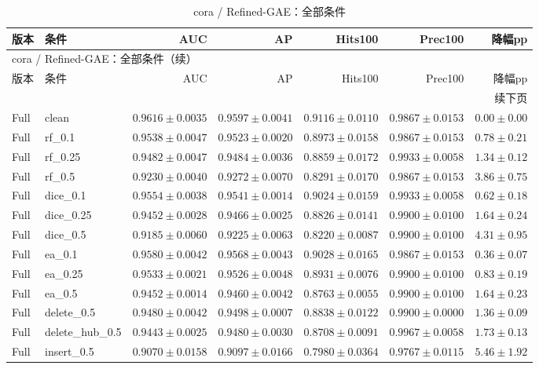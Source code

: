 \documentclass[UTF8,a4paper,11pt,fontset=fandol]{ctexart}
\begin{document}
{\footnotesize
\setlength{\tabcolsep}{3pt}
\begin{longtable}{llrrrrr}
\caption{cora / Refined-GAE：全部条件}\\
\toprule
版本 & 条件 & AUC & AP & Hits100 & Prec100 & 降幅pp \\
\midrule
\endfirsthead
\multicolumn{7}{l}{cora / Refined-GAE：全部条件（续）}\\
\toprule
版本 & 条件 & AUC & AP & Hits100 & Prec100 & 降幅pp \\
\midrule
\endhead
\midrule\multicolumn{7}{r}{续下页}\\
\endfoot
\bottomrule\endlastfoot
Full & clean & $0.9616\pm0.0035$ & $0.9597\pm0.0041$ & $0.9116\pm0.0110$ & $0.9867\pm0.0153$ & $0.00\pm0.00$ \\
Full & rf\_0.1 & $0.9538\pm0.0047$ & $0.9523\pm0.0020$ & $0.8973\pm0.0158$ & $0.9867\pm0.0153$ & $0.78\pm0.21$ \\
Full & rf\_0.25 & $0.9482\pm0.0047$ & $0.9484\pm0.0036$ & $0.8859\pm0.0172$ & $0.9933\pm0.0058$ & $1.34\pm0.12$ \\
Full & rf\_0.5 & $0.9230\pm0.0040$ & $0.9272\pm0.0070$ & $0.8291\pm0.0170$ & $0.9867\pm0.0153$ & $3.86\pm0.75$ \\
Full & dice\_0.1 & $0.9554\pm0.0038$ & $0.9541\pm0.0014$ & $0.9024\pm0.0159$ & $0.9933\pm0.0058$ & $0.62\pm0.18$ \\
Full & dice\_0.25 & $0.9452\pm0.0028$ & $0.9466\pm0.0025$ & $0.8826\pm0.0141$ & $0.9900\pm0.0100$ & $1.64\pm0.24$ \\
Full & dice\_0.5 & $0.9185\pm0.0060$ & $0.9225\pm0.0063$ & $0.8220\pm0.0087$ & $0.9900\pm0.0100$ & $4.31\pm0.95$ \\
Full & ea\_0.1 & $0.9580\pm0.0042$ & $0.9568\pm0.0043$ & $0.9028\pm0.0165$ & $0.9867\pm0.0153$ & $0.36\pm0.07$ \\
Full & ea\_0.25 & $0.9533\pm0.0021$ & $0.9526\pm0.0048$ & $0.8931\pm0.0076$ & $0.9900\pm0.0100$ & $0.83\pm0.19$ \\
Full & ea\_0.5 & $0.9452\pm0.0014$ & $0.9460\pm0.0042$ & $0.8763\pm0.0055$ & $0.9900\pm0.0100$ & $1.64\pm0.23$ \\
Full & delete\_0.5 & $0.9480\pm0.0042$ & $0.9498\pm0.0007$ & $0.8838\pm0.0122$ & $0.9900\pm0.0000$ & $1.36\pm0.09$ \\
Full & delete\_hub\_0.5 & $0.9443\pm0.0025$ & $0.9480\pm0.0030$ & $0.8708\pm0.0091$ & $0.9967\pm0.0058$ & $1.73\pm0.13$ \\
Full & insert\_0.5 & $0.9070\pm0.0158$ & $0.9097\pm0.0166$ & $0.7980\pm0.0364$ & $0.9767\pm0.0115$ & $5.46\pm1.92$ \\

\end{longtable}}
\end{document}
